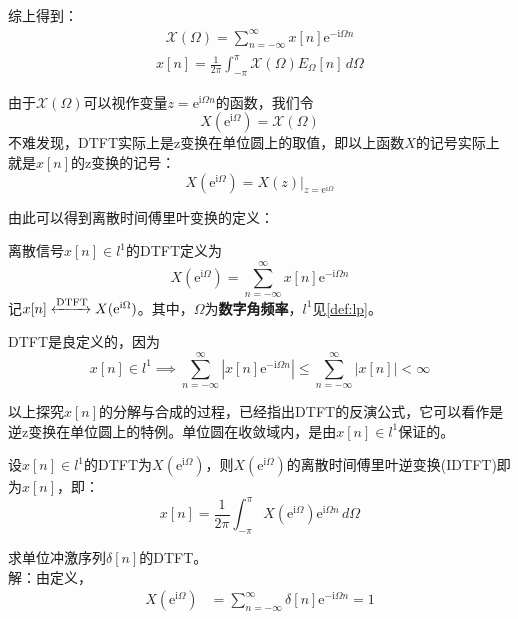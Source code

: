 综上得到：\begin{align*}
    \mathcal{X} (\Omega)=\sum_{n=-\infty}^{\infty}x[n]\mathrm{e}^{-\mathrm{i}\Omega n}
\end{align*}
\begin{align*}
    x[n]=\frac{1}{2\pi}\int_{-\pi}^{\pi}\mathcal{X} (\Omega)E_{\Omega}[n]\,d\Omega
\end{align*}

由于$\mathcal{X} (\Omega)$可以视作变量$z=\mathrm{e}^{\mathrm{i}\Omega n}$的函数，我们令
$$X(\mathrm{e}^{\mathrm{i}\Omega})=\mathcal{X} (\Omega)$$
不难发现，DTFT实际上是z变换在单位圆上的取值，即以上函数$X$的记号实际上就是$x[n]$的z变换的记号：
\[X(\mathrm{e}^{\mathrm{i}\Omega})=X(z)|_{z=\mathrm{e}^{\mathrm{i}\Omega}}\]

由此可以得到离散时间傅里叶变换的定义：

\begin{definition}[离散时间傅里叶变换]\label{def:DTFT}
    离散信号$x[n]\in l^1$的DTFT定义为
    \[X(\mathrm{e}^{\mathrm{i}\Omega})=\sum_{n=-\infty}^{\infty}x[n]\mathrm{e}^{-\mathrm{i}\Omega n}\]
    记$x[n]\xleftrightarrow{\mathrm{DTFT}}X(\mathrm{e}^{\mathrm{i}\Omega})$。其中，$\Omega $为\textbf{数字角频率}，$l^1$见\cref{def:lp}。
\end{definition}

DTFT是良定义的，因为
\[x[n]\in l^1\implies \sum_{n=-\infty}^{\infty}\left|x[n]\mathrm{e}^{-\mathrm{i}\Omega n}\right|\leq \sum_{n=-\infty}^{\infty}|x[n]|<\infty\]

以上探究$x[n]$的分解与合成的过程，已经指出DTFT的反演公式，它可以看作是逆z变换在单位圆上的特例。单位圆在收敛域内，是由$x[n]\in l^1$保证的。
\begin{theorem}[离散时间傅里叶反演公式]\label{thm:DTFT_inv}
    设$x[n]\in l^1$的DTFT为$X(\mathrm{e}^{\mathrm{i}\Omega})$，则$X(\mathrm{e}^{\mathrm{i}\Omega})$的离散时间傅里叶逆变换(IDTFT)即为$x[n]$，即：
    \[x[n]=\frac{1}{2\pi}\int_{-\pi}^{\pi}X(\mathrm{e}^{\mathrm{i}\Omega})\mathrm{e}^{\mathrm{i}\Omega n}\,d\Omega\]
\end{theorem}

\begin{example}
    求单位冲激序列$\delta[n]$的DTFT。\\
    解：由定义，
    \begin{align*}
        X(\mathrm{e}^{\mathrm{i}\Omega})&=\sum_{n=-\infty}^{\infty}\delta[n]\mathrm{e}^{-\mathrm{i}\Omega n}=1
    \end{align*}
\end{example}

